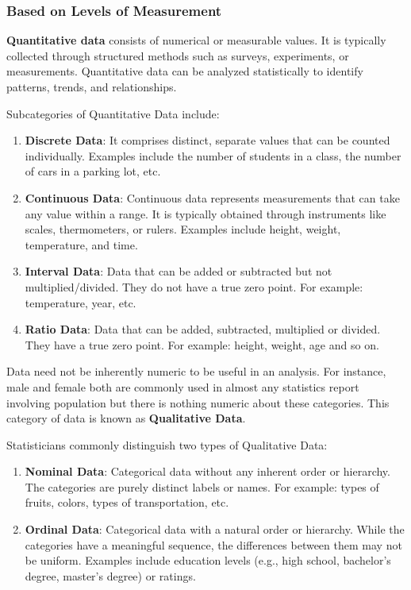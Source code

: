 \documentclass{article}
\begin{document}
\subsubsection{Based on Levels of Measurement}

\textbf{Quantitative data} consists of numerical or measurable values. It is typically collected through structured methods such as surveys, experiments, or measurements. Quantitative data can be analyzed statistically to identify patterns, trends, and relationships. \cite{statistics_nutshell}
\bigskip

\noindent Subcategories of Quantitative Data include:
\begin{enumerate}
    \item \textbf{Discrete Data}: It comprises distinct, separate values that can be counted individually. Examples include the number of students in a class, the number of cars in a parking lot, etc.

    \item \textbf{Continuous Data}: Continuous data represents measurements that can take any value within a range. It is typically obtained through instruments like scales, thermometers, or rulers. Examples include height, weight, temperature, and time.

    \item \textbf{Interval Data}: Data that can be added or subtracted but not multiplied/divided. They do not have a true zero point. For example: temperature, year, etc.

    \item \textbf{Ratio Data}: Data that can be added, subtracted, multiplied or divided. They have a true zero point. For example: height, weight, age and so on.
\end{enumerate}

\noindent Data need not be inherently numeric to be useful in an analysis. For instance, male and female both are commonly used in almost any statistics report involving population but there is nothing numeric about these categories. This category of data is known as \textbf{Qualitative Data}.
\bigskip

\noindent Statisticians commonly distinguish two types of Qualitative Data:
\begin{enumerate}
    \item \textbf{Nominal Data}: Categorical data without any inherent order or hierarchy. The categories are purely distinct labels or names. For example: types of fruits, colors, types of transportation, etc.

    \item \textbf{Ordinal Data}: Categorical data with a natural order or hierarchy. While the categories have a meaningful sequence, the differences between them may not be uniform. Examples include education  levels (e.g., high school, bachelor's degree, master's degree) or ratings.

\end{enumerate}
\end{document}
